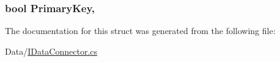 \subsubsection[{Primary\+Key}]{\setlength{\rightskip}{0pt plus 5cm}bool Primary\+Key\hspace{0.3cm}{\ttfamily [get]}, {\ttfamily [set]}}\label{structOTA_1_1Data_1_1TableColumn_a75d37c9ec186c55dbc7f55fbc45ffec9}


The documentation for this struct was generated from the following file\+:\begin{DoxyCompactItemize}
\item 
Data/\hyperlink{IDataConnector_8cs}{I\+Data\+Connector.\+cs}\end{DoxyCompactItemize}
